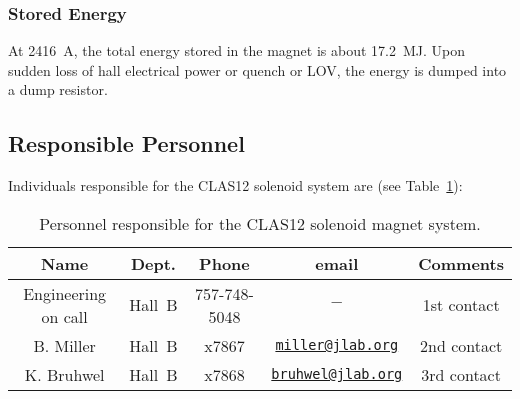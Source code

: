\subsubsection{Stored Energy}

At 2416~A, the total energy stored in the magnet is about 17.2~MJ. Upon sudden loss of hall 
electrical power or quench or LOV, the energy is dumped into a dump resistor.

\subsection{Responsible Personnel}

Individuals responsible for the CLAS12 solenoid system are (see Table~\ref{tb:solenoid}):

\begin{table}[!htb]
\centering
\begin{tabular}{|c|c|c|c|c|} \hline
Name&Dept.&Phone&email&Comments \\ \hline
Engineering on call& Hall~B & 757-748-5048 &$-$& 1st contact \\ \hline
B. Miller          & Hall~B & x7867 &\href{mailto:miller@jlab.org}{\nolinkurl{miller@jlab.org}}&2nd contact \\ \hline
K. Bruhwel         & Hall~B & x7868 &\href{mailto:}{\nolinkurl{bruhwel@jlab.org}}&3rd contact \\ \hline
\end{tabular}
\caption{Personnel responsible for the CLAS12 solenoid magnet system.} 
\label{tb:solenoid}
\end{table}

